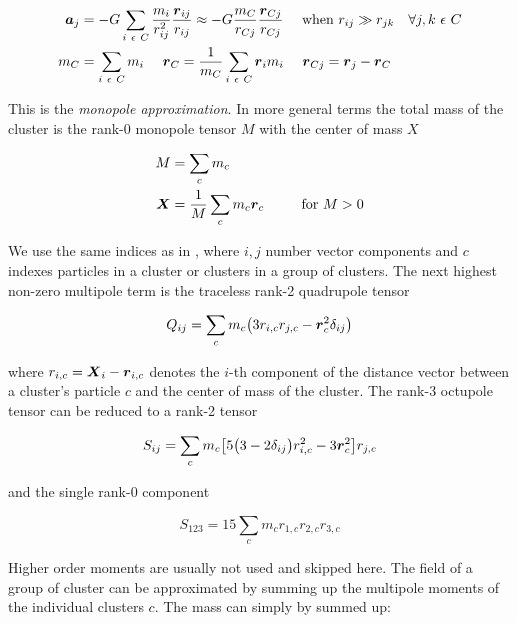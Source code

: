 \begin{align}
\label{ch02_grav02_eq001}
\boldsymbol{a}_j &= - G \sum_{i~\epsilon~C} \frac{m_i}{r_{ij}^2} \frac{\boldsymbol{r}_{ij}}{r_{ij}} \approx - G \frac{m_{C}}{r_{Cj}} \frac{\boldsymbol{r}_{Cj}}{r_{Cj}} ~~~~ \text{when}~r_{ij} \gg r_{jk} ~~~ \forall j,k ~ \epsilon~C \\
m_C &= \sum_{i~\epsilon~C} m_i ~~~~ \boldsymbol{r}_C = \frac{1}{m_C} \sum_{i~\epsilon~C} \boldsymbol{r}_i m_i ~~~~ \boldsymbol{r}_{Cj} = \boldsymbol{r}_j - \boldsymbol{r}_C 
\end{align}

This is the \emph{monopole approximation}. In more general terms the total mass of the cluster is the rank-0 monopole tensor $M$ with the center of mass $X$

\begin{align}
\label{ch02_grav02_eq002}
M & = \sum_{c} m_{c} \\
\boldsymbol{X}  & = \frac{1}{M} \sum_{c} m_{c} \boldsymbol{r}_{c} ~~~~~~~~ \text{for}~M > 0
\end{align}

We use the same indices as in \cite{McMillan:1993p43}, where $i,j$ number vector components and $c$ indexes particles in a cluster or clusters in a group of clusters. The next highest non-zero multipole term is the traceless rank-2 quadrupole tensor

\begin{equation}
\label{ch02_grav02_eq003}
Q_{ij} = \sum_{c} m_c \big( 3 r_{i, c} r_{j, c} - \boldsymbol{r}_{c}^2 \delta_{i j} \big) \\
\end{equation}

where $r_{i,c} = \boldsymbol{X}_i - \boldsymbol{r}_{i,c}$ denotes the $i$-th component of the distance vector between a cluster's particle $c$ and the center of mass of the cluster. The rank-3 octupole tensor can be reduced to a rank-2 tensor 

\begin{equation}
\label{ch02_grav02_eq004}
S_{ij}  = \sum_{c} m_c \big[ 5 \big( 3 - 2  \delta_{i j} \big) r_{i, c}^2 - 3 \boldsymbol{r}_{c}^2 \big] r_{j, c}\\
\end{equation}

and the single rank-0 component

\begin{equation}
\label{ch02_grav02_eq005}
S_{1 2 3} = 15 \sum_{c} m_c r_{1, c} r_{2, c} r_{3, c}
\end{equation}

Higher order moments are usually not used and skipped here. The field of a group of cluster can be approximated by summing up the multipole moments of the individual clusters $c$. The mass can simply by summed up:

